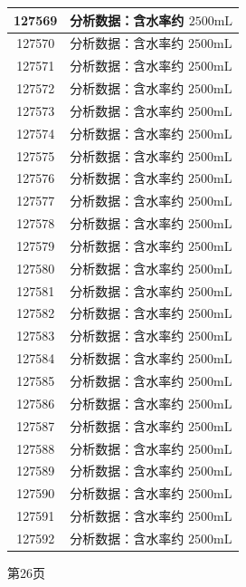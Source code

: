 \documentclass[UTF8,10pt,a4paper,fontset=fandol]{ctexart}
\begin{document}
\begin{center}
\begin{minipage}[t]{0.47\textwidth}
\begin{tabularx}{\linewidth}{|c|X|}
127569 & 分析数据：含水率约 $2500\mathrm{mL}$ \\ \hline
127570 & 分析数据：含水率约 $2500\mathrm{mL}$ \\ \hline
127571 & 分析数据：含水率约 $2500\mathrm{mL}$ \\ \hline
127572 & 分析数据：含水率约 $2500\mathrm{mL}$ \\ \hline
127573 & 分析数据：含水率约 $2500\mathrm{mL}$ \\ \hline
127574 & 分析数据：含水率约 $2500\mathrm{mL}$ \\ \hline
127575 & 分析数据：含水率约 $2500\mathrm{mL}$ \\ \hline
127576 & 分析数据：含水率约 $2500\mathrm{mL}$ \\ \hline
127577 & 分析数据：含水率约 $2500\mathrm{mL}$ \\ \hline
127578 & 分析数据：含水率约 $2500\mathrm{mL}$ \\ \hline
127579 & 分析数据：含水率约 $2500\mathrm{mL}$ \\ \hline
127580 & 分析数据：含水率约 $2500\mathrm{mL}$ \\ \hline
127581 & 分析数据：含水率约 $2500\mathrm{mL}$ \\ \hline
127582 & 分析数据：含水率约 $2500\mathrm{mL}$ \\ \hline
127583 & 分析数据：含水率约 $2500\mathrm{mL}$ \\ \hline
127584 & 分析数据：含水率约 $2500\mathrm{mL}$ \\ \hline
127585 & 分析数据：含水率约 $2500\mathrm{mL}$ \\ \hline
127586 & 分析数据：含水率约 $2500\mathrm{mL}$ \\ \hline
127587 & 分析数据：含水率约 $2500\mathrm{mL}$ \\ \hline
127588 & 分析数据：含水率约 $2500\mathrm{mL}$ \\ \hline
127589 & 分析数据：含水率约 $2500\mathrm{mL}$ \\ \hline
127590 & 分析数据：含水率约 $2500\mathrm{mL}$ \\ \hline
127591 & 分析数据：含水率约 $2500\mathrm{mL}$ \\ \hline
127592 & 分析数据：含水率约 $2500\mathrm{mL}$ \\ \hline
\end{tabularx}

\smallskip
第26页
\end{minipage}

\vspace{1.5em}


\end{center}
\end{document}
